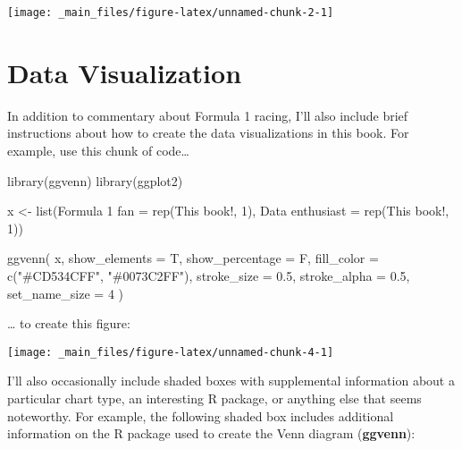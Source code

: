 \documentclass[
]{book}
\newenvironment{Shaded}{\begin{snugshade}}{\end{snugshade}}
\newcommand{\AttributeTok}[1]{\textcolor[rgb]{0.77,0.63,0.00}{#1}}
\newcommand{\DecValTok}[1]{\textcolor[rgb]{0.00,0.00,0.81}{#1}}
\newcommand{\FloatTok}[1]{\textcolor[rgb]{0.00,0.00,0.81}{#1}}
\newcommand{\FunctionTok}[1]{\textcolor[rgb]{0.00,0.00,0.00}{#1}}
\newcommand{\NormalTok}[1]{#1}
\newcommand{\OtherTok}[1]{\textcolor[rgb]{0.56,0.35,0.01}{#1}}
\newcommand{\StringTok}[1]{\textcolor[rgb]{0.31,0.60,0.02}{#1}}
\begin{document}
\begin{center}\texttt{[image: \_main\_files/figure-latex/unnamed-chunk-2-1]} \end{center}

\hypertarget{data-visualization}{%
\section{Data Visualization}\label{data-visualization}}

In addition to commentary about Formula 1 racing, I'll also include brief instructions about how to create the data visualizations in this book. For example, use this chunk of code\ldots{}

\begin{Shaded}
\begin{Highlighting}[]
\FunctionTok{library}\NormalTok{(ggvenn)}
\FunctionTok{library}\NormalTok{(ggplot2)}

\NormalTok{x }\OtherTok{\textless{}{-}} \FunctionTok{list}\NormalTok{(}\StringTok{\textasciigrave{}}\AttributeTok{Formula 1 fan}\StringTok{\textasciigrave{}} \OtherTok{=} \FunctionTok{rep}\NormalTok{(}\StringTok{\textquotesingle{}This book!\textquotesingle{}}\NormalTok{, }\DecValTok{1}\NormalTok{),}
          \StringTok{\textasciigrave{}}\AttributeTok{Data enthusiast}\StringTok{\textasciigrave{}} \OtherTok{=} \FunctionTok{rep}\NormalTok{(}\StringTok{\textquotesingle{}This book!\textquotesingle{}}\NormalTok{, }\DecValTok{1}\NormalTok{))}


\FunctionTok{ggvenn}\NormalTok{(}
\NormalTok{  x, }
  \AttributeTok{show\_elements =}\NormalTok{ T,}
  \AttributeTok{show\_percentage =}\NormalTok{ F,}
  \AttributeTok{fill\_color =} \FunctionTok{c}\NormalTok{(}\StringTok{"\#CD534CFF"}\NormalTok{, }\StringTok{"\#0073C2FF"}\NormalTok{),}
  \AttributeTok{stroke\_size =} \FloatTok{0.5}\NormalTok{, }\AttributeTok{stroke\_alpha =} \FloatTok{0.5}\NormalTok{, }\AttributeTok{set\_name\_size =} \DecValTok{4}
\NormalTok{  )}
\end{Highlighting}
\end{Shaded}

\ldots{} to create this figure:

\begin{center}\texttt{[image: \_main\_files/figure-latex/unnamed-chunk-4-1]} \end{center}

I'll also occasionally include shaded boxes with supplemental information about a particular chart type, an interesting R package, or anything else that seems noteworthy. For example, the following shaded box includes additional information on the R package used to create the Venn diagram (\textbf{ggvenn}):
\end{document}
